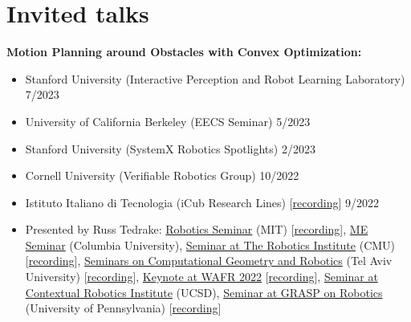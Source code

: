 \documentclass[11pt,a4paper,sans]{moderncv}
\begin{document}
\section{Invited talks}

\vspace{5pt}

\textbf{Motion Planning around Obstacles with Convex Optimization:}

\vspace{5pt}

\begin{itemize}

\item Stanford University (Interactive Perception and Robot Learning Laboratory) \hfill 7/2023
\item University of California Berkeley (EECS Seminar) \hfill 5/2023
\item Stanford University (SystemX Robotics Spotlights) \hfill 2/2023
\item Cornell University (Verifiable Robotics Group) \hfill 10/2022
\item  Istituto Italiano di Tecnologia (iCub Research Lines) [\href{https://www.youtube.com/watch?v=FoqAAgqgn-o}{\color{orange}recording}] \hfill 9/2022

\item
Presented by Russ Tedrake:
\href{https://robotics.mit.edu/robotics-seminar}{\color{cyan}Robotics Seminar} (MIT)
[\href{https://www.youtube.com/watch?v=JZokn4Pc-YY}{\color{orange}recording}],
\href{https://events.columbia.edu/cal/event/showEventMore.rdo}{\color{cyan}ME Seminar} (Columbia University),
\href{https://www.ri.cmu.edu/event/ri-seminar-russ-tedrake-mit-professor-2023-01-27/}{\color{cyan}Seminar at The Robotics Institute} (CMU)
[\href{https://www.youtube.com/watch?v=KSCC7mVJzaw}{\color{orange}recording}],
\href{http://acg.cs.tau.ac.il/cg-seminar/2023/Motion\%20Planning\%20Around\%20Obstacles\%20with\%20Convex\%20Optimization}{\color{cyan}Seminars on Computational Geometry and Robotics} (Tel Aviv University)
[\href{https://www.youtube.com/watch?v=5E2OaizkJEs}{\color{orange}recording}],
\href{https://wafr2022.github.io/index.html#keynotes}{\color{cyan}Keynote at WAFR 2022}
[\href{https://youtu.be/NBR2G4gD7XI?t=5911}{\color{orange}recording}],
\href{http://cri.ucsd.edu/seminars/motion-planning-around-obstacles-convex-optimization}{\color{cyan}Seminar at Contextual Robotics Institute} (UCSD),
\href{https://www.grasp.upenn.edu/events/grasp-on-robotics-russ-tedrake/}{\color{cyan}Seminar at GRASP on Robotics} (University of Pennsylvania) [\href{https://www.youtube.com/watch?v=wciDaoNSwwk}{\color{orange}recording}]



\end{itemize}
\end{document}
